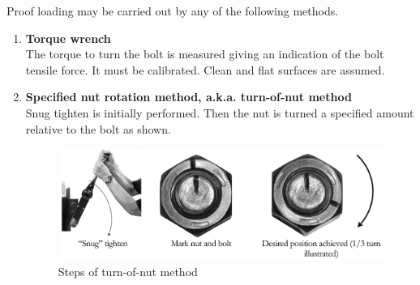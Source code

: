 Proof loading may be carried out by any of the following methods.
\begin{enumerate}
\item \textbf{Torque wrench}\\The torque to turn the bolt is measured  giving an indication of the bolt tensile force. It must be calibrated. Clean and flat surfaces are assumed.
\item \textbf{Specified nut rotation method, a.k.a. turn-of-nut method}\\Snug tighten is initially performed. Then the nut is turned a specified amount relative to the bolt as shown.
\begin{figure}[H]
\centering\includegraphics[scale=.25]{PIC/CH06/TON}\caption{Steps of turn-of-nut method}
\end{figure}


\end{enumerate}
